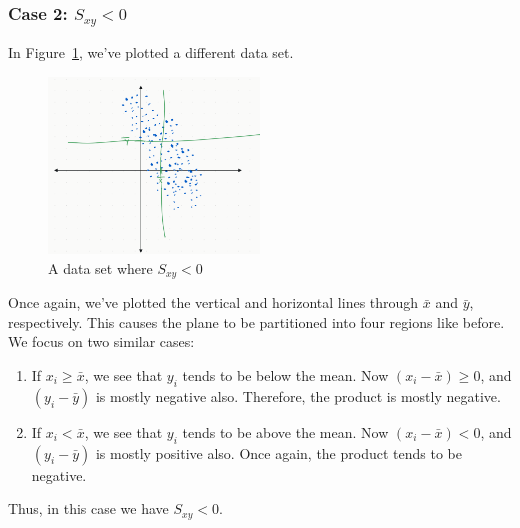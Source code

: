 \documentclass[12pt, a4paper]{article}
\theoremstyle{definition}
\begin{document}
	\subsubsection*{Case 2: $S_{xy} < 0$}
	In Figure~\ref{fig:dataset-negative_{sxy}}, we've plotted a different data set.
	\begin{figure}
		\centering
		\includegraphics[width=0.5\textwidth]{negative-covariance-rvs}
		\caption{A data set where $S_{xy}<0$}
		\label{fig:dataset-negative_{sxy}}
	\end{figure}
	Once again, we've plotted
	the vertical and horizontal lines through $\bar{x}$ and $\bar{y}$, respectively. This causes
	the plane to be partitioned into four regions like before. We focus on two similar
	cases:
	\begin{enumerate}[label=(\roman*)]
		\item If $x_i\geq \bar{x}$, we see that $y_i$ tends to be below the mean.
		Now $(x_i - \bar{x})\geq 0$, and $(y_i-\bar{y})$ is mostly negative also.
		Therefore, the product is mostly negative.
		\item If $x_i < \bar{x}$, we see that $y_i$ tends to be above the mean.
		Now $(x_i-\bar{x})<0$, and $(y_i-\bar{y})$ is mostly positive also.
		Once again, the product tends to be negative.
	\end{enumerate}
	Thus, in this case we have $S_{xy}<0$.
\end{document}
